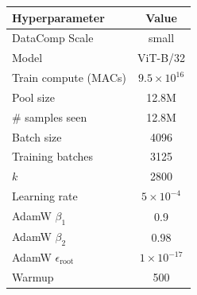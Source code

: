 \begin{tabular}{lc}
\toprule
\textbf{Hyperparameter} & \textbf{Value} \\
\midrule
DataComp Scale & small \\
Model & ViT-B/32 \\
Train compute (MACs) & $9.5 \times 10^{16}$ \\
Pool size & 12.8M \\
\# samples seen & 12.8M \\
Batch size & 4096 \\
Training batches & 3125 \\
$k$ & 2800 \\
Learning rate & $5 \times 10^{-4}$ \\
AdamW $\beta_1$ & 0.9 \\
AdamW $\beta_2$ & 0.98 \\
AdamW $\epsilon_{\textrm{root}}$ & $1 \times 10^{-17}$ \\
Warmup & 500 \\
\bottomrule
\end{tabular}
